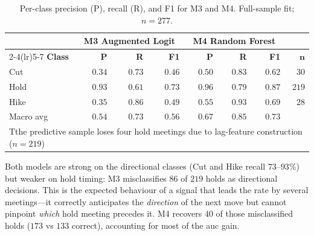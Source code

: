 \begin{table}[htbp]
    \centering
    \caption[Per-class classification metrics, MRO target]{Per-class precision (P), recall (R), and F1 for M3 and M4. Full-sample fit; $n = 277$.}
    \label{tab:classification_v2}
    \begin{tabular}{@{}l rrr rrr r@{}}
        \toprule       & \multicolumn{3}{c}{\textbf{M3 Augmented Logit}} & \multicolumn{3}{c}{\textbf{M4 Random Forest}} &                                                                        \\
        \cmidrule(lr){2-4}\cmidrule(lr){5-7}
        \textbf{Class} & \textbf{P}                                      & \textbf{R}                                    & \textbf{F1} & \textbf{P} & \textbf{R} & \textbf{F1} & $\boldsymbol{n}$ \\ \midrule
        Cut            & $0.34$                                          & $0.73$                                        & $0.46$      & $0.50$     & $0.83$     & $0.62$      & $30$             \\
        Hold           & $0.93$                                          & $0.61$                                        & $0.73$      & $0.96$     & $0.79$     & $0.87$      & $219$            \\
        Hike           & $0.35$                                          & $0.86$                                        & $0.49$      & $0.55$     & $0.93$     & $0.69$      & $28$             \\
        \midrule
        Macro avg      & $0.54$                                          & $0.73$                                        & $0.56$      & $0.67$     & $0.85$     & $0.73$      &                  \\
        \bottomrule
        \multicolumn{8}{l}{\footnotesize{Tthe predictive sample loses four hold meetings due to lag-feature construction ($n=219$)}}
    \end{tabular}
\end{table}

Both models are strong on the directional classes (Cut and Hike recall $73$--$93\%$) but weaker on hold timing: M3 misclassifies $86$ of $219$ holds as directional decisions. This is the expected behaviour of a signal that leads the rate by several meetings---it correctly anticipates the
\emph{direction} of the next move but cannot pinpoint \emph{which} hold meeting precedes it. M4 recovers $40$ of those misclassified holds ($173$ vs $133$ correct), accounting for most of the \gls{auc} gain.

